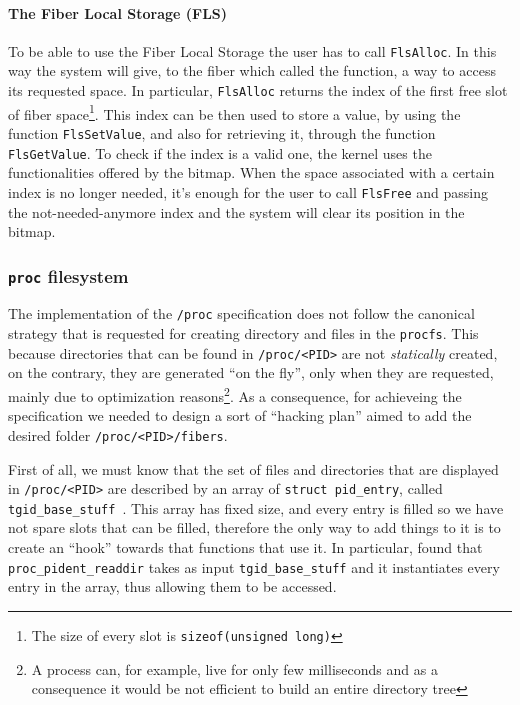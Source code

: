 \documentclass[a4paper,10pt]{article}
\begin{document}
  \paragraph{The Fiber Local Storage (FLS)}
    To be able to use the Fiber Local Storage the user has to call \lstinline{FlsAlloc}. In this way the system will give, to the fiber which called the function, a way to access its requested space. In particular, \lstinline{FlsAlloc} returns the index of the first free slot of fiber space\footnote{The size of every slot is \lstinline{sizeof(unsigned long)}}. This index can be then used to store a value, by using the function \lstinline{FlsSetValue}, and also for retrieving it, through the function \lstinline{FlsGetValue}. To check if the index is a valid one, the kernel uses the functionalities offered by the bitmap. When the space associated with a certain index is no longer needed, it’s enough for the user to call \lstinline{FlsFree} and passing the not-needed-anymore index and the system will clear its position in the bitmap.

\subsubsection{\texttt{\/proc} filesystem}\label{subsubsec:kern-procfs}
  The implementation of the \texttt{/proc} specification does not follow the canonical strategy that is requested for creating directory and files in the \texttt{procfs}. This because directories that can be found in \lstinline{/proc/<PID>} are not \textit{statically} created, on the contrary, they are generated ``on the fly'', only when they are requested, mainly due to optimization reasons\footnote{A process can, for example, live for only few milliseconds and as a consequence it would be not efficient to build an entire directory tree}. As a consequence, for achieveing the specification we needed to design a sort of ``hacking plan'' aimed to add the desired folder \lstinline{/proc/<PID>/fibers}.

  First of all, we must know that the set of files and directories that are displayed in \lstinline{/proc/<PID>} are described by an array of \lstinline{struct pid_entry}, called \lstinline{tgid_base_stuff}~\cite{kern_tgid_base_stuff}. This array has fixed size, and every entry is filled so we have not spare slots that can be filled, therefore the only way to add things to it is to create an ``hook'' towards that functions that use it. In particular, found that \lstinline{proc_pident_readdir} takes as input \lstinline{tgid_base_stuff} and it instantiates every entry in the array, thus allowing them to be accessed.
\end{document}
